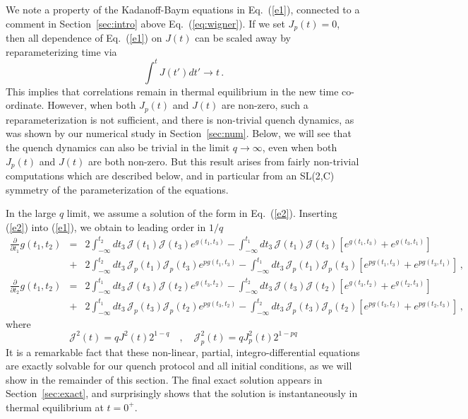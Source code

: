 \documentclass[prx,aps,onecolumn,amsfonts,showpacs,superscriptaddress,preprint,eqsecnum]
{revtex4-1}
\newcommand{\beq}{\begin{equation}}
\newcommand{\eeq}{\end{equation}}
\def\bea{\begin{eqnarray}}
\def\eea{\end{eqnarray}}
\newcommand{\nn}{\nonumber \\}
\begin{document}
We note a property of the Kadanoff-Baym equations in Eq.~(\ref{e1}), connected to a comment in Section~\ref{sec:intro} above Eq.~(\ref{eq:wigner}). 
If we set $J_p (t) = 0$, then all dependence of Eq.~(\ref{e1})
on $J(t)$ can be scaled away by reparameterizing time via
\beq
\int^t J(t') dt' \rightarrow t \,. \label{e1a}
\eeq
This implies that correlations remain in thermal equilibrium in the new time co-ordinate.
However, when both $J_p (t)$ and $J (t)$ are non-zero, such a reparameterization is
not sufficient, and there is non-trivial quench
dynamics, as was shown by our numerical study in Section~\ref{sec:num}. Below, we will see that
the quench dynamics can also be trivial in the limit $q \rightarrow \infty$, even when both
$J_p(t)$ and $J(t)$ are both non-zero. But this result arises from fairly non-trivial computations which are described below, and in particular from an SL(2,C) symmetry of the 
parameterization of the equations. 

In the large $q$ limit, we assume a solution of the form in Eq.~(\ref{e2}).
Inserting (\ref{e2}) into (\ref{e1}), we obtain to leading order in $1/q$
\bea
\frac{\partial}{\partial t_1} g(t_1,t_2) &=& 
2 \int_{-\infty}^{t_2} dt_3  \, \mathcal{J}(t_1) \mathcal{J}(t_3) e^{g(t_1,t_3)} 
 -\int_{-\infty}^{t_1} dt_3 \, \mathcal{J}(t_1) \mathcal{J}(t_3) \left[ e^{g(t_1,t_3)} + e^{g(t_3,t_1)} \right]  
  \nn
&+& 2 \int_{-\infty}^{t_2} dt_3  \, \mathcal{J}_p (t_1) \mathcal{J}_p (t_3) e^{pg(t_1,t_3)} -\int_{-\infty}^{t_1} dt_3 \, \mathcal{J}_p (t_1) \mathcal{J}_p (t_3) \left[ e^{pg(t_1,t_3)} + e^{pg(t_3,t_1)} \right]  \, ,
  \nn
 \frac{\partial}{ \partial t_2} g(t_1,t_2) &=& 2 \int_{-\infty}^{t_1} dt_3  \, \mathcal{J}(t_3) \mathcal{J}(t_2) e^{g(t_3,t_2)} 
-  \int_{-\infty}^{t_2} dt_3  \, \mathcal{J}(t_3) \mathcal{J}(t_2) \left[ e^{g(t_3,t_2)} + e^{g (t_2,t_3)} \right] \label{e3} \\
&+& 2 \int_{-\infty}^{t_1} dt_3  \, \mathcal{J}_p(t_3) \mathcal{J}_p(t_2) e^{pg(t_3,t_2)} 
-  \int_{-\infty}^{t_2} dt_3  \, \mathcal{J}_p(t_3) \mathcal{J}_p (t_2) \left[ e^{pg(t_3,t_2)} + e^{pg (t_2,t_3)} \right] \, ,
\nonumber
\eea
where
\beq
\mathcal{J}^2 (t) = q J^2 (t) 2^{1-q} \quad , \quad \mathcal{J}_p^2 (t) = q J_p^2 (t) 2^{1-pq}\label{e4}
\eeq
It is a remarkable fact that these non-linear, partial, 
integro-differential equations are exactly solvable for our quench protocol and all initial conditions, as we will show in the remainder of this section. The final exact solution appears in Section~\ref{sec:exact}, and surprisingly shows that the solution is instantaneously in thermal equilibrium at $t=0^+$.
\end{document}
